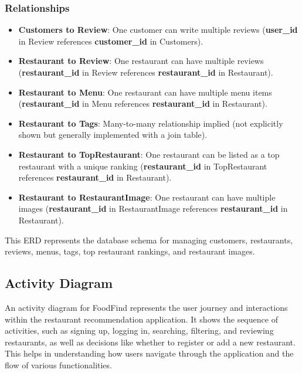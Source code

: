 \documentclass[12pt, a4paper, oneside]{article}
\begin{document}
\subsubsection{Relationships}

\begin{itemize}
    \item \textbf{Customers to Review}: One customer can write multiple reviews (\textbf{user\_id} in Review references \textbf{customer\_id} in Customers).
    \item \textbf{Restaurant to Review}: One restaurant can have multiple reviews (\textbf{restaurant\_id} in Review references \textbf{restaurant\_id} in Restaurant).
    \item \textbf{Restaurant to Menu}: One restaurant can have multiple menu items (\textbf{restaurant\_id} in Menu references \textbf{restaurant\_id} in Restaurant).
    \item \textbf{Restaurant to Tags}: Many-to-many relationship implied (not explicitly shown but generally implemented with a join table).
    \item \textbf{Restaurant to TopRestaurant}: One restaurant can be listed as a top restaurant with a unique ranking (\textbf{restaurant\_id} in TopRestaurant references \textbf{restaurant\_id} in Restaurant).
    \item \textbf{Restaurant to RestaurantImage}: One restaurant can have multiple images (\textbf{restaurant\_id} in RestaurantImage references \textbf{restaurant\_id} in Restaurant).
\end{itemize}

This ERD represents the database schema for managing customers, restaurants, reviews, menus, tags, top restaurant rankings, and restaurant images.




\pagebreak

\subsection{Activity Diagram}
An activity diagram for FoodFind represents the user journey and interactions within the restaurant recommendation application. It shows the sequence of activities, such as signing up, logging in, searching, filtering, and reviewing restaurants, as well as decisions like whether to register or add a new restaurant. This helps in understanding how users navigate through the application and the flow of various functionalities. 
\end{document}
